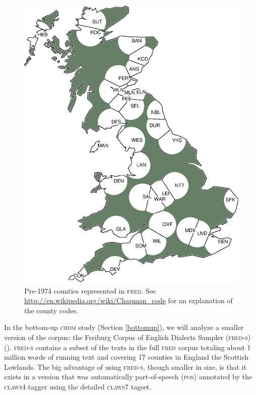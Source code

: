 \documentclass[output=paper]{LSP/langsci}
\begin{document}
\begin{figure}[t]
    \includegraphics [keepaspectratio,width=.5\textwidth] {illustrations/wolk_map_descr_all34_counties.eps}
    \caption{Pre-1974 counties represented in \textsc{fred}. See \url{http://en.wikipedia.org/wiki/Chapman_code} for an explanation of the county codes.}\label{coverage}
\end{figure}


In the bottom-up \textsc{cbdm} study (Section \ref{bottomup}), we will analyze a smaller version of the corpus: the Freiburg Corpus of English Dialects Sampler (\textsc{fred-s}) (\citealt{szmrecsanyi_manual_2007}). \textsc{fred-s} contains a subset of the texts in the full \textsc{fred} corpus totaling about 1 million words of running text and covering 17 counties in England the Scottish Lowlands. The big advantage of using \textsc{fred-s}, though smaller in size, is that it exists in a version that was automatically part-of-speech (\textsc{pos}) annotated by the \textsc{claws4} tagger \citep{garside_hybrid_1997} using the detailed \textsc{claws7} tagset.
\end{document}
